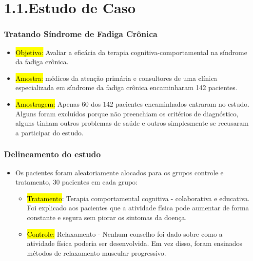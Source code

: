 
\section{1.1.Estudo de Caso}




\begin{frame}
\frametitle{Tratando Síndrome de Fadiga Crônica}


\begin{itemize}
\justifying
\item \hl{Objetivo:} Avaliar a eficácia da terapia cognitiva-comportamental na síndrome da fadiga crônica.


\item \hl{Amostra:}  médicos da atenção primária e consultores de uma clínica especializada em síndrome da fadiga crônica encaminharam 142 pacientes.


\item \hl{Amostragem:} Apenas 60 dos 142 pacientes encaminhados entraram no estudo. Alguns foram excluídos porque não preenchiam os critérios de diagnóstico, alguns tinham outros problemas de saúde e outros simplesmente se recusaram a participar do estudo.

\end{itemize}

\justifying
{}

\end{frame}


\begin{frame}
\frametitle{Delineamento do estudo}

\begin{itemize}
\justifying
\item Os pacientes foram aleatoriamente alocados para os grupos controle e tratamento, 30 pacientes em cada grupo:
\begin{itemize}
\justifying
\item \hl{Tratamento}: Terapia comportamental cognitiva - colaborativa e educativa. Foi explicado aos pacientes que a atividade física pode aumentar de forma constante e segura sem piorar os sintomas da doença.
\justifying
\item \hl{Controle:} Relaxamento - Nenhum conselho foi dado sobre como a atividade física poderia ser desenvolvida. Em vez disso, foram ensinados métodos de relaxamento muscular progressivo.
\end{itemize}

\end{itemize}

\end{frame}

